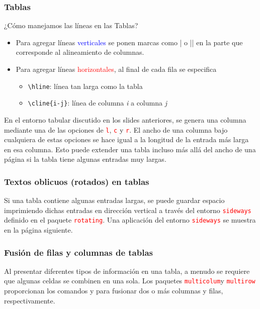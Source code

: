 \documentclass[11pt]{beamer}
\theoremstyle{plain} %
\theoremstyle{definition}
\begin{document}
    \begin{frame}[fragile]
    	\frametitle{Tablas}
    	\begin{block}{¿Cómo manejamos las líneas en las Tablas?}
    		\begin{itemize}
    			\item Para agregar líneas \textcolor{blue}{verticales} se ponen marcas como | o || en la parte que corresponde al alineamiento de columnas.
    			\item Para agregar líneas \textcolor{red}{horizontales}, al final de cada fila se especifica
    			\begin{itemize}
    				\item \verb|\hline|: línea tan larga como la tabla
    				\item\verb|\cline{i-j}|: línea de columna \textit{i} a columna \textit{j}
    			\end{itemize}
    		\end{itemize}
    		En el entorno tabular discutido en los slides anteriores, se genera una columna mediante una de las opciones de  \textcolor{red}{\texttt{l}}, \textcolor{red}{\texttt{c}} y \textcolor{red}{\texttt{r}}. El ancho de una columna bajo cualquiera de estas opciones se hace igual a la longitud de la entrada más larga en esa columna. Esto puede extender una tabla incluso más allá del ancho de una página si la tabla tiene algunas entradas muy largas.
    	\end{block}
    \end{frame}
    \begin{frame}[fragile]
    	\frametitle{Textos oblicuos (rotados) en tablas}
    	Si una tabla contiene algunas entradas largas, se puede guardar espacio imprimiendo dichas entradas en dirección vertical a través del entorno \textcolor{red}{\texttt{sideways}} definido en el paquete \textcolor{red}{\texttt{rotating}}. Una aplicación del entorno \textcolor{red}{\texttt{sideways}} se muestra en la página siguiente.
    \end{frame}
    \begin{frame}[fragile]
    	\frametitle{Fusión de filas y columnas de tablas}
    	
    	Al presentar diferentes tipos de información en una tabla, a menudo se requiere que algunas celdas se combinen en una sola. Los paquetes \textcolor{red}{\texttt{multicolum}}y \textcolor{red}{\texttt{multirow}} proporcionan los comandos {\color{blue}{\verb|\multicolumn{}{}{}|}} y {\color{blue}{\verb|\multirow{}{}{}|}} para fusionar dos o más columnas y filas, respectivamente.
    \end{frame}    
\end{document}
